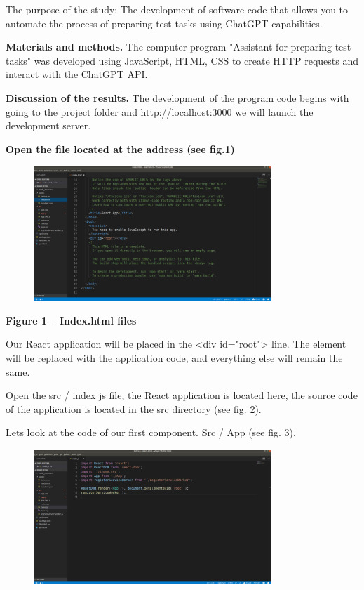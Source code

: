 The purpose of the study: The development of software code that allows
you to automate the process of preparing test tasks using ChatGPT
capabilities.

{\bfseries Materials and methods.} The computer program "Assistant for
preparing test tasks" was developed using JavaScript, HTML, CSS to
create HTTP requests and interact with the ChatGPT API.

{\bfseries Discussion of the results.} The development of the program code
begins with going to the project folder and http://localhost:3000 we
will launch the development server.

{\bfseries Open the file located at the address (see fig.1)}

\begin{figure}[H]
	\centering
	\includegraphics[width=0.8\textwidth]{assets/45}
	\caption*{}
\end{figure}

{\bfseries Figure 1− Index.html files}

Our React application will be placed in the \textless div
id="root"\textgreater{} line. The element will be replaced with the
application code, and everything else will remain the same.

Open the src / index js file, the React application is located here, the
source code of the application is located in the src directory (see fig.
2).

Let\textquotesingle s look at the code of our first component. Src / App
(see fig. 3).

\begin{figure}[H]
	\centering
	\includegraphics[width=0.8\textwidth]{assets/46}
	\caption*{}
\end{figure}

